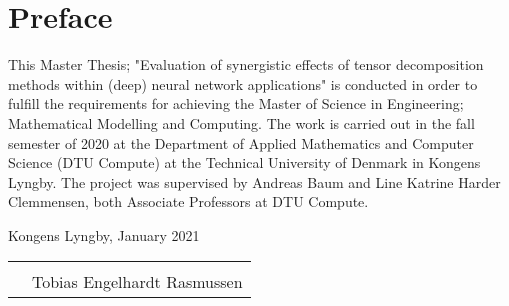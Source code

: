 \section{Preface}

\noindent This Master Thesis; "Evaluation of synergistic effects of tensor decomposition methods within (deep) neural network applications" is conducted in order to fulfill the requirements for achieving the Master of Science in Engineering; Mathematical Modelling and Computing. The work is carried out in the fall semester of 2020 at the Department of Applied Mathematics and Computer Science (DTU Compute) at the Technical University of Denmark in Kongens Lyngby. The project was supervised by Andreas Baum and Line Katrine Harder Clemmensen, both Associate Professors at DTU Compute.

\vspace{4cm}
\begin{flushright}
Kongens Lyngby, January 2021 \\
\vspace{2cm}

\begin{tabular}{ll}
         &                   \\ \hline
         &                    \\
 & Tobias Engelhardt Rasmussen
\end{tabular}

\end{flushright}
